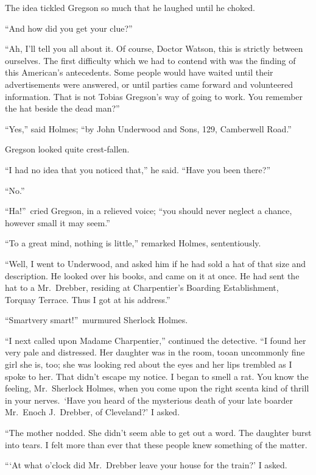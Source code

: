 \documentclass[12pt,english]{book}
\begin{document}
The idea tickled Gregson so much that he laughed until he choked.

{}``And how did you get your clue?''

{}``Ah, I'll tell you all about it. Of course, Doctor Watson, this
is strictly between ourselves. The first difficulty which we had to
contend with was the finding of this American's antecedents. Some
people would have waited until their advertisements were answered,
or until parties came forward and volunteered information. That is
not Tobias Gregson's way of going to work. You remember the hat beside
the dead man?''

{}``Yes,'' said Holmes; {}``by John Underwood and Sons, 129, Camberwell
Road.''

Gregson looked quite crest-fallen.

{}``I had no idea that you noticed that,'' he said. {}``Have you
been there?''

{}``No.''

{}``Ha!''\ cried Gregson, in a relieved voice; {}``you should
never neglect a chance, however small it may seem.''

{}``To a great mind, nothing is little,'' remarked Holmes, sententiously.

{}``Well, I went to Underwood, and asked him if he had sold a hat
of that size and description. He looked over his books, and came on
it at once. He had sent the hat to a Mr.\ Drebber, residing at Charpentier's
Boarding Establishment, Torquay Terrace. Thus I got at his address.''

{}``Smart\mdsh{---}very smart!''\ murmured Sherlock Holmes.

{}``I next called upon Madame Charpentier,'' continued the detective.
{}``I found her very pale and distressed. Her daughter was in the
room, too\mdsh{---}an uncommonly fine girl she is, too; she was looking
red about the eyes and her lips trembled as I spoke to her. That didn't
escape my notice. I began to smell a rat. You know the feeling, Mr.\ Sherlock
Holmes, when you come upon the right scent\mdsh{---}a kind of thrill
in your nerves.\  `Have you heard of the mysterious death of your
late boarder Mr.\ Enoch J.\ Drebber, of Cleveland?' I asked.

{}``The mother nodded. She didn't seem able to get out a word. The
daughter burst into tears. I felt more than ever that these people
knew something of the matter.

{}```At what o'clock did Mr.\ Drebber leave your house for the train?'
I asked.
\end{document}
